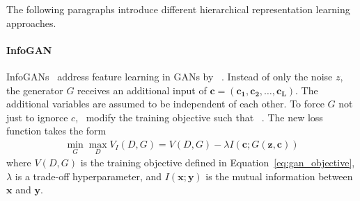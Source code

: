 The following paragraphs introduce different hierarchical representation learning approaches.

\paragraph{InfoGAN}
InfoGANs~\cite{chen2016infogan} address feature learning in \acp{GAN} by ~\citep{chen2016infogan}.
Instead of only the noise $z$, the generator $G$ receives an additional input of  $\bm{c} = (\bm{c_1}, \bm{c_2}, \dots, \bm{c_L})$.
The additional variables are assumed to be independent of each other.
To force $G$ not just to ignorce $c$,~\citet{chen2016infogan} modify the training objective such that ~\citep{chen2016infogan}.
The new loss function takes the form
\begin{align}
    \min _{G} \max _{D} V_I(D, G)=V(D, G) - \lambda I(\bm{c}; G(\bm{z}, \bm{c}))
\end{align}
where $V(D, G)$ is the training objective defined in Equation~\ref{eq:gan_objective}, $\lambda$ is a trade-off hyperparameter, and $I(\bm{x}; \bm{y})$ is the mutual information between $\bm{x}$ and $\bm{y}$.

